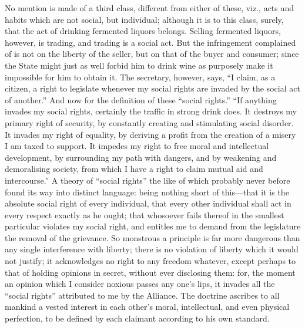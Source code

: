 \documentclass[11pt,openany]{book}
\begin{document}
No mention is made of a third class, different from either of these, viz., acts and habits which are not social, but individual; although it is to this class, surely, that the act of drinking fermented liquors belongs. Selling fermented liquors, however, is trading, and trading is a social act. But the infringement complained of is not on the liberty of the seller, but on that of the buyer and consumer; since the State might just as well forbid him to drink wine as purposely make it impossible for him to obtain it. The secretary, however, says, ``I claim, as a citizen, a right to legislate whenever my social rights are invaded by the social act of another.'' And now for the definition of these ``social rights.'' ``If anything invades my social rights, certainly the traffic in strong drink does. It destroys my primary right of security, by constantly creating and stimulating social disorder. It invades my right of equality, by deriving a profit from the creation of a misery I am taxed to support. It impedes my right to free moral and intellectual development, by surrounding my path with dangers, and by weakening and demoralising society, from which I have a right to claim mutual aid and intercourse.'' A theory of ``social rights'' the like of which probably never before found its way into distinct language: being nothing short of this---that it is the absolute social right of every individual, that every other individual shall act in every respect exactly as he ought; that whosoever fails thereof in the smallest particular violates my social right, and entitles me to demand from the legislature the removal of the grievance. So monstrous a principle is far more dangerous than any single interference with liberty; there is no violation of liberty which it would not justify; it acknowledges no right to any freedom whatever, except perhaps to that of holding opinions in secret, without ever disclosing them: for, the moment an opinion which I consider noxious passes any one's lips, it invades all the ``social rights'' attributed to me by the Alliance. The doctrine ascribes to all mankind a vested interest in each other's moral, intellectual, and even physical perfection, to be defined by each claimant according to his own standard.
\end{document}
